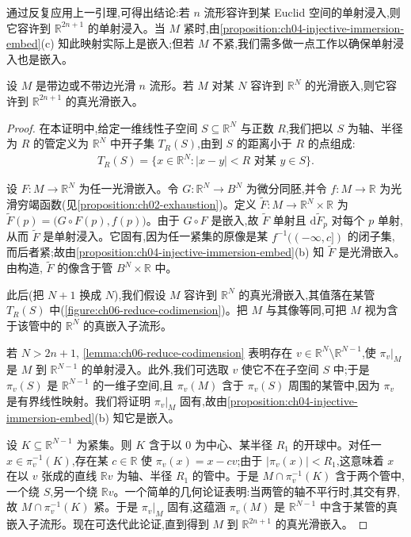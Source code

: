 \documentclass[../../main.tex]{subfiles}
\begin{document}
通过反复应用上一引理,可得出结论:若 $n$ 流形容许到某 Euclid 空间的单射浸入,则它容许到 $\mathbb{R}^{2n+1}$ 的单射浸入。当 $M$ 紧时,由\cref{proposition:ch04-injective-immersion-embed}(c) 知此映射实际上是嵌入;但若 $M$ 不紧,我们需多做一点工作以确保单射浸入也是嵌入。

\begin{lemma}\label{lemma:ch06-proper-embedding-2n1}
设 $M$ 是带边或不带边光滑 $n$ 流形。若 $M$ 对某 $N$ 容许到 $\mathbb{R}^N$ 的光滑嵌入,则它容许到 $\mathbb{R}^{2n+1}$ 的真光滑嵌入。
\end{lemma}

\begin{proof}
在本证明中,给定一维线性子空间 $S\subseteq\mathbb{R}^N$ 与正数 $R$,我们把以 $S$ 为轴、半径为 $R$ 的管定义为 $\mathbb{R}^N$ 中开子集 $T_R(S)$,由到 $S$ 的距离小于 $R$ 的点组成:
\begin{align*}
T_R(S)=\{x\in\mathbb{R}^N:|x-y|<R\text{ 对某 }y\in S\}.
\end{align*}

设 $F:M\to\mathbb{R}^N$ 为任一光滑嵌入。令 $G:\mathbb{R}^N\to B^N$ 为微分同胚,并令 $f:M\to\mathbb{R}$ 为光滑穷竭函数(见\cref{proposition:ch02-exhaustion})。定义 $\widetilde{F}:M\to\mathbb{R}^N\times\mathbb{R}$ 为 $\widetilde{F}(p)=\bigl(G\circ F(p),f(p)\bigr)$。由于 $G\circ F$ 是嵌入,故 $\widetilde{F}$ 单射且 $\mathrm{d}\widetilde{F}_p$ 对每个 $p$ 单射,从而 $\widetilde{F}$ 是单射浸入。它固有,因为任一紧集的原像是某 $f^{-1}((-\infty,c])$ 的闭子集,而后者紧;故由\cref{proposition:ch04-injective-immersion-embed}(b) 知 $\widetilde{F}$ 是光滑嵌入。由构造, $\widetilde{F}$ 的像含于管 $B^N\times\mathbb{R}$ 中。

此后(把 $N+1$ 换成 $N$),我们假设 $M$ 容许到 $\mathbb{R}^N$ 的真光滑嵌入,其值落在某管 $T_R(S)$ 中(\cref{figure:ch06-reduce-codimension})。把 $M$ 与其像等同,可把 $M$ 视为含于该管中的 $\mathbb{R}^N$ 的真嵌入子流形。

若 $N>2n+1$, \cref{lemma:ch06-reduce-codimension} 表明存在 $v\in\mathbb{R}^N\setminus\mathbb{R}^{N-1}$,使 $\pi_v|_M$ 是 $M$ 到 $\mathbb{R}^{N-1}$ 的单射浸入。此外,我们可选取 $v$ 使它不在子空间 $S$ 中;于是 $\pi_v(S)$ 是 $\mathbb{R}^{N-1}$ 的一维子空间,且 $\pi_v(M)$ 含于 $\pi_v(S)$ 周围的某管中,因为 $\pi_v$ 是有界线性映射。我们将证明 $\pi_v|_M$ 固有,故由\cref{proposition:ch04-injective-immersion-embed}(b) 知它是嵌入。

设 $K\subseteq\mathbb{R}^{N-1}$ 为紧集。则 $K$ 含于以 $0$ 为中心、某半径 $R_1$ 的开球中。对任一 $x\in\pi_v^{-1}(K)$,存在某 $c\in\mathbb{R}$ 使 $\pi_v(x)=x-cv$;由于 $|\pi_v(x)|<R_1$,这意味着 $x$ 在以 $v$ 张成的直线 $\mathbb{R}v$ 为轴、半径 $R_1$ 的管中。于是 $M\cap\pi_v^{-1}(K)$ 含于两个管中,一个绕 $S$,另一个绕 $\mathbb{R}v$。一个简单的几何论证表明:当两管的轴不平行时,其交有界,故 $M\cap\pi_v^{-1}(K)$ 紧。于是 $\pi_v|_M$ 固有,这蕴涵 $\pi_v(M)$ 是 $\mathbb{R}^{N-1}$ 中含于某管的真嵌入子流形。现在可迭代此论证,直到得到 $M$ 到 $\mathbb{R}^{2n+1}$ 的真光滑嵌入。
\end{proof}
\end{document}
